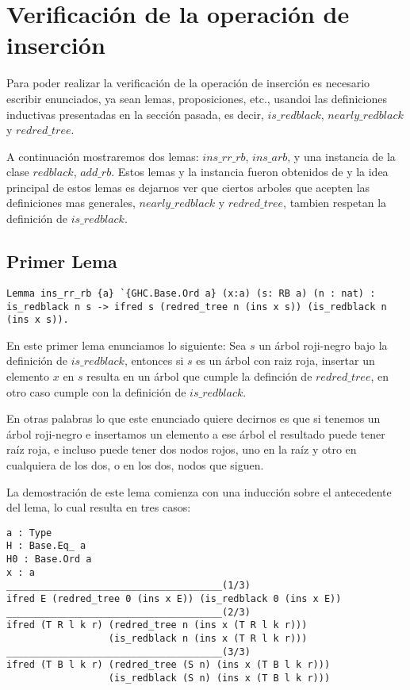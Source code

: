 \documentclass[letterpaper,12pt,oneside]{book}
\newcommand{\arn}{árbol roji-negro}
\theoremstyle{plain}
\theoremstyle{definition}
\theoremstyle{remark}
\begin{document}
\section{Verificación de la operación de inserción}

Para poder realizar la verificaci\'on de la operaci\'on de inserci\'on es necesario escribir enunciados, ya sean 
lemas, proposiciones, etc., usandoi las definiciones inductivas presentadas en la secci\'on pasada, es decir, 
$is\_redblack$, $nearly\_redblack$ y $redred\_tree$.

A continuaci\'on mostraremos dos lemas: $ins\_rr\_rb$, $ins\_arb$, y una instancia\cite{classes} de la clase 
$redblack$, $add\_rb$. Estos lemas y la instancia fueron obtenidos de \cite{MSetRBT} y la idea principal de estos lemas es dejarnos ver que ciertos arboles que acepten las definiciones mas generales, $nearly\_redblack$ y $redred\_tree$, tambien respetan la definici\'on de $is\_redblack$.

\subsection{Primer Lema}

\begin{verbatim}
Lemma ins_rr_rb {a} `{GHC.Base.Ord a} (x:a) (s: RB a) (n : nat) :
is_redblack n s -> ifred s (redred_tree n (ins x s)) (is_redblack n (ins x s)).
\end{verbatim}
 En este primer lema enunciamos lo siguiente: Sea $s$ un {\arn} bajo la definici\'on de $is\_redblack$, entonces 
 si $s$ es un \'arbol con raiz roja, insertar un elemento $x$ en $s$ resulta en un \'arbol que cumple la 
 definci\'on de $redred\_tree$, en otro caso cumple con la definici\'on de $is\_redblack$.

 En otras palabras lo que este enunciado quiere decirnos es que si tenemos un {\arn} e insertamos un elemento a 
 ese \'arbol el resultado puede tener ra\'iz roja, e incluso puede tener dos nodos rojos, uno en la ra\'iz y otro
 en cualquiera de los dos, o en los dos, nodos que siguen.

 La demostraci\'on de este lema comienza con una inducci\'on sobre el antecedente del lema, lo cual resulta en 
 tres casos:
 \begin{verbatim}
a : Type
H : Base.Eq_ a
H0 : Base.Ord a
x : a
______________________________________(1/3)
ifred E (redred_tree 0 (ins x E)) (is_redblack 0 (ins x E))
______________________________________(2/3)
ifred (T R l k r) (redred_tree n (ins x (T R l k r))) 
                  (is_redblack n (ins x (T R l k r)))
______________________________________(3/3)
ifred (T B l k r) (redred_tree (S n) (ins x (T B l k r)))
                  (is_redblack (S n) (ins x (T B l k r)))
 \end{verbatim}
\end{document}

